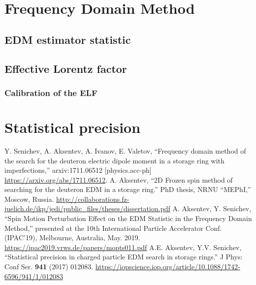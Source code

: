 \documentclass[12pt]{article}
\begin{document}
\section{Frequency Domain Method}
\subsection{EDM estimator statistic}


\subsection{Effective Lorentz factor}
%


\subsubsection{Calibration of the ELF}


\section{Statistical precision}


\begin{thebibliography}{0}
	Y. Senichev, A. Aksentev, A. Ivanov, E. Valetov, ``Frequency domain method of the search for
	the deuteron electric dipole moment in a storage ring with imperfections,'' arxiv:1711.06512 [physics.acc-ph]
	\url{https://arxiv.org/abs/1711.06512}.
	A. Aksentev, ``2D Frozen spin method of searching for the deuteron EDM in a storage ring.'' PhD thesis, NRNU ``MEPhI,'' Moscow, Russia.
	\url{http://collaborations.fz-juelich.de/ikp/jedi/public_files/theses/dissertation.pdf}
	A. Aksentev, Y. Senichev, ``Spin Motion Perturbation Effect on the EDM Statistic
	in the Frequency Domain Method,'' presented at the 10th International Particle Accelerator Conf. (IPAC'19),
	Melbourne, Australia, May. 2019.
	\url{https://ipac2019.vrws.de/papers/mopts011.pdf}
	A.E. Aksentev, Y.V. Senichev, ``Statistical precision in charged particle EDM search in storage rings.'' J Phys: Conf Ser. \textbf{941} (2017) 012083. 
	\url{https://iopscience.iop.org/article/10.1088/1742-6596/941/1/012083}
	
\end{thebibliography}
\end{document}
